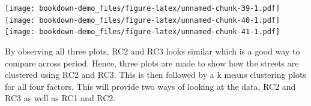 \documentclass[]{book}
\newenvironment{Shaded}{\begin{snugshade}}{\end{snugshade}}
\newcommand{\KeywordTok}[1]{\textcolor[rgb]{0.13,0.29,0.53}{\textbf{#1}}}
\newcommand{\DataTypeTok}[1]{\textcolor[rgb]{0.13,0.29,0.53}{#1}}
\newcommand{\DecValTok}[1]{\textcolor[rgb]{0.00,0.00,0.81}{#1}}
\newcommand{\StringTok}[1]{\textcolor[rgb]{0.31,0.60,0.02}{#1}}
\newcommand{\CommentTok}[1]{\textcolor[rgb]{0.56,0.35,0.01}{\textit{#1}}}
\newcommand{\OperatorTok}[1]{\textcolor[rgb]{0.81,0.36,0.00}{\textbf{#1}}}
\newcommand{\NormalTok}[1]{#1}
\begin{document}
\begin{Shaded}
\end{Shaded}

\texttt{[image: bookdown-demo\_files/figure-latex/unnamed-chunk-39-1.pdf]}
\texttt{[image: bookdown-demo\_files/figure-latex/unnamed-chunk-40-1.pdf]}
\texttt{[image: bookdown-demo\_files/figure-latex/unnamed-chunk-41-1.pdf]}

By observing all three plots, RC2 and RC3 looks similar which is a good
way to compare across period. Hence, three plots are made to show how
the streets are clustered using RC2 and RC3. This is then followed by a
k means clustering plots for all four factors. This will provide two
ways of looking at the data, RC2 and RC3 as well as RC1 and RC2.
\end{document}
